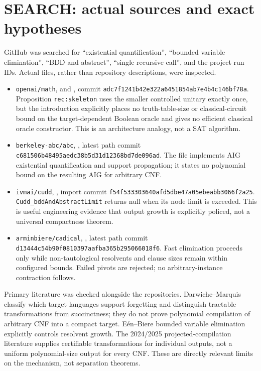 \documentclass[11pt]{article}
\begin{document}
\section{SEARCH: actual sources and exact hypotheses}
GitHub was searched for ``existential quantification'', ``bounded variable elimination'', ``BDD and abstract'', ``single recursive call'', and the project run IDs.  Actual files, rather than repository descriptions, were inspected.
\begin{itemize}
\item \texttt{openai/math},  and , commit \texttt{adc7f1241b42e322a6451854ab7e4b4c146bf78a}.  Proposition \texttt{rec:skeleton} uses the smaller controlled unitary exactly once, but the introduction explicitly places no truth-table-size or classical-circuit bound on the target-dependent Boolean oracle and gives no efficient classical oracle constructor.  This is an architecture analogy, not a SAT algorithm.
\item \texttt{berkeley-abc/abc}, , latest path commit \texttt{c681506b48495aedc38b5d31d12368bd7de096ad}.  The file implements AIG existential quantification and support propagation; it states no polynomial bound on the resulting AIG for arbitrary CNF.
\item \texttt{ivmai/cudd}, , import commit \texttt{f54f533303640afd5dbe47a05ebeabb3066f2a25}.  \texttt{Cudd\_bddAndAbstractLimit} returns null when its node limit is exceeded.  This is useful engineering evidence that output growth is explicitly policed, not a universal compactness theorem.
\item \texttt{arminbiere/cadical}, , latest path commit \texttt{d13444c54b90f0810397aafba365b295066018f6}.  Fast elimination proceeds only while non-tautological resolvents and clause sizes remain within configured bounds.  Failed pivots are rejected; no arbitrary-instance contraction follows.
\end{itemize}
Primary literature was checked alongside the repositories.  Darwiche--Marquis classify which target languages support forgetting and distinguish tractable transformations from succinctness; they do not prove polynomial compilation of arbitrary CNF into a compact target.  E\'en--Biere bounded variable elimination explicitly controls resolvent growth.  The 2024/2025 projected-compilation literature supplies certifiable transformations for individual outputs, not a uniform polynomial-size output for every CNF.  These are directly relevant limits on the mechanism, not separation theorems.
\end{document}
